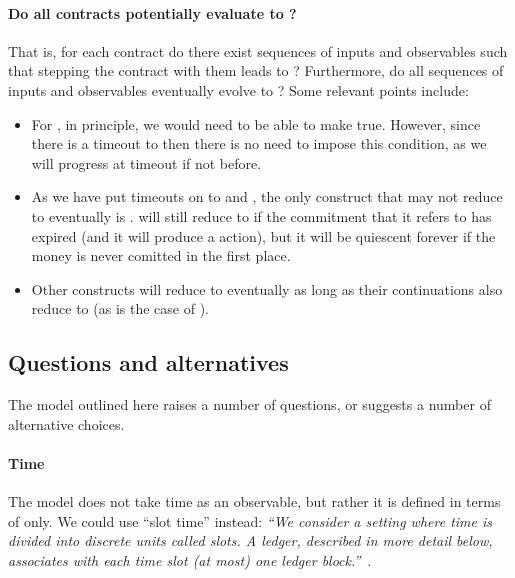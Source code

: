 \documentclass[runningheads]{llncs}
\begin{document}
{\paragraph{Do all contracts potentially evaluate to ?}

That is, for each contract do there exist sequences of inputs and observables such that stepping the contract with them 
leads to ? Furthermore, do all sequences of inputs and observables eventually evolve to 
? Some relevant points include:
\begin{itemize}
\item For , in principle, we would need to be able to make  
true. However, since there is  a timeout to  then there is no need to impose this condition, as we 
will progress at timeout if not before.
\item As we have put timeouts on to  and , the only construct that may not 
reduce to  eventually is .  will still reduce to 
 if the commitment that it refers to has expired (and it will produce a 
 action), but it will be quiescent forever if the money is never comitted in the first 
place.
\item Other constructs will reduce to  eventually as long as their continuations also reduce to 
 (as is the case of ).
\end{itemize}

\subsection{Questions and alternatives}

The model outlined here raises a number of questions, or suggests a number of alternative choices.

\paragraph{Time}

The model does not take time as an observable, but rather it is defined in terms of  only. 
We could  use ``slot time'' instead: \emph{``We consider a setting where time is divided into discrete units called 
slots. A ledger, described in more detail below, associates with each time slot (at most) one ledger 
block.''}~\cite{Shardagnostic}.

}
\end{document}
